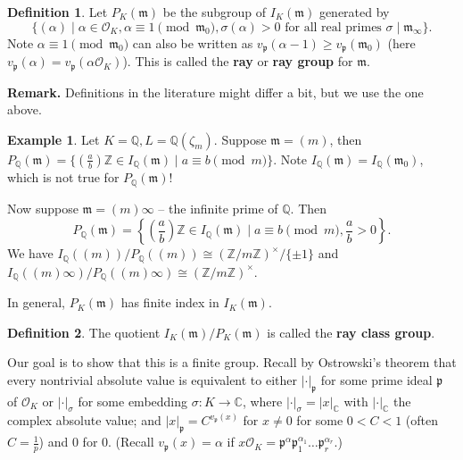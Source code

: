 \documentclass{article}
\theoremstyle{definition}
\newtheorem{example}{Example}[section]
\newtheorem{defn}{Definition}[section]
\begin{document}
\begin{defn}
    Let $P_K(\mathfrak{m})$ be the subgroup of $I_K(\mathfrak{m})$ generated by 
    \[
        \{(\alpha) \mid \alpha \in \mathcal{O}_K, \alpha \equiv 1 \pmod{\mathfrak{m}_0}, \sigma(\alpha)>0 \text{ for all real primes }\sigma \mid \mathfrak{m}_{\infty}\}.
    \]
    Note $\alpha \equiv 1 \pmod{\mathfrak{m}_0}$ can also be written as $v_{\mathfrak{p}}(\alpha-1) \ge v_{\mathfrak{p}}(\mathfrak{m}_0)$ (here $v_{\mathfrak{p}}(\alpha) = v_{\mathfrak{p}}(\alpha \mathcal{O}_K)$). This is called the \textbf{ray} or \textbf{ray group} for $\mathfrak{m}$.
\end{defn}
\textbf{Remark.} Definitions in the literature might differ a bit, but we use the one above.
\begin{example}
    Let $K = \mathbb{Q}, L = \mathbb{Q}(\zeta_m)$. Suppose $\mathfrak{m} = (m)$, then $P_{\mathbb{Q}}(\mathfrak{m}) = \{\left(\frac{a}{b}\right)\mathbb{Z} \in I_{\mathbb{Q}}(\mathfrak{m}) \mid a \equiv b \pmod{m}\}$. Note $I_{\mathbb{Q}}(\mathfrak{m}) = I_{\mathbb{Q}}(\mathfrak{m}_0)$, which is not true for $P_\mathbb{Q}(\mathfrak{m})$!
    \vspace{1mm}
     
    Now suppose $\mathfrak{m} = (m)\infty$ -- the infinite prime of $\mathbb{Q}$. Then \[
    P_\mathbb{Q}(\mathfrak{m}) = \left\{\left(\frac{a}{b}\right)\mathbb{Z} \in I_\mathbb{Q}(\mathfrak{m}) \mid a \equiv b\pmod{m}, \frac{a}{b}>0\right\}.
    \]
    We have $I_{\mathbb{Q}}((m))/P_\mathbb{Q}((m)) \cong (\mathbb{Z}/m\mathbb{Z})^\times/\{\pm 1\}$ and $I_\mathbb{Q}((m)\infty)/P_\mathbb{Q}((m)\infty) \cong (\mathbb{Z}/m\mathbb{Z})^\times$. 
\end{example}
In general, $P_K(\mathfrak{m})$ has finite index in $I_K(\mathfrak{m})$.
\begin{defn}
    The quotient $I_K(\mathfrak{m})/P_K(\mathfrak{m})$ is called the \textbf{ray class group}.
\end{defn}
Our goal is to show that this is a finite group. Recall by Ostrowski's theorem that every nontrivial absolute value is equivalent to either $|\cdot|_{\mathfrak{p}}$ for some prime ideal $\mathfrak{p}$ of $\mathcal{O}_K$ or $|\cdot|_{\sigma}$ for some embedding $\sigma : K \to \mathbb{C}$, where $|\cdot|_{\sigma} = |x|_{\mathbb{C}}$ with $|\cdot|_{\mathbb{C}}$ the complex absolute value; and $|x|_{\mathfrak{p}} = C^{v_\mathfrak{p}(x)}$ for $x \neq 0$ for some $0<C<1$ (often $C =\frac{1}{p}$) and $0$ for $0$. (Recall $v_{\mathfrak{p}}(x) = \alpha$ if $x \mathcal{O}_K = \mathfrak{p}^\alpha \mathfrak{p}_1^{\alpha_1}\ldots \mathfrak{p}_r^{\alpha_r}$.)
\end{document}
